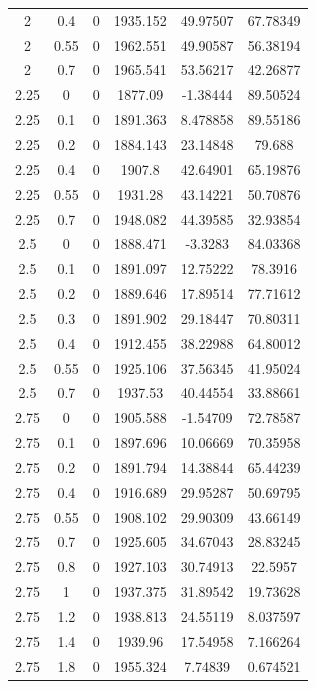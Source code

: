 \begin{longtable}{|c|c|c|c|c|c|}
	2     & 0.4   & 0     & 1935.152 & 49.97507 & 67.78349 \\ 
	2     & 0.55  & 0     & 1962.551 & 49.90587 & 56.38194 \\ 
	2     & 0.7   & 0     & 1965.541 & 53.56217 & 42.26877 \\	
	2.25  & 0     & 0     & 1877.09 & -1.38444 & 89.50524 \\	
	2.25  & 0.1   & 0     & 1891.363 & 8.478858 & 89.55186 \\	
	2.25  & 0.2   & 0     & 1884.143 & 23.14848 & 79.688 \\ 	
	2.25  & 0.4   & 0     & 1907.8 & 42.64901 & 65.19876 \\	
	2.25  & 0.55  & 0     & 1931.28 & 43.14221 & 50.70876 \\	
	2.25  & 0.7   & 0     & 1948.082 & 44.39585 & 32.93854 \\	
	2.5   & 0     & 0     & 1888.471 & -3.3283 & 84.03368 \\	
	2.5   & 0.1   & 0     & 1891.097 & 12.75222 & 78.3916 \\ 
	2.5   & 0.2   & 0     & 1889.646 & 17.89514 & 77.71612 \\ 
	2.5   & 0.3   & 0     & 1891.902 & 29.18447 & 70.80311 \\
	2.5   & 0.4   & 0     & 1912.455 & 38.22988 & 64.80012 \\
	2.5   & 0.55  & 0     & 1925.106 & 37.56345 & 41.95024 \\
	2.5   & 0.7   & 0     & 1937.53 & 40.44554 & 33.88661 \\
	2.75  & 0     & 0     & 1905.588 & -1.54709 & 72.78587 \\
	2.75  & 0.1   & 0     & 1897.696 & 10.06669 & 70.35958 \\
	2.75  & 0.2   & 0     & 1891.794 & 14.38844 & 65.44239 \\
	2.75  & 0.4   & 0     & 1916.689 & 29.95287 & 50.69795 \\
	2.75  & 0.55  & 0     & 1908.102 & 29.90309 & 43.66149 \\
	2.75  & 0.7   & 0     & 1925.605 & 34.67043 & 28.83245 \\
	2.75  & 0.8   & 0     & 1927.103 & 30.74913 & 22.5957 \\
	2.75  & 1     & 0     & 1937.375 & 31.89542 & 19.73628 \\
	2.75  & 1.2   & 0     & 1938.813 & 24.55119 & 8.037597 \\
	2.75  & 1.4   & 0     & 1939.96 & 17.54958 & 7.166264 \\
	2.75  & 1.8   & 0     & 1955.324 & 7.74839 & 0.674521 \\

\end{longtable}
